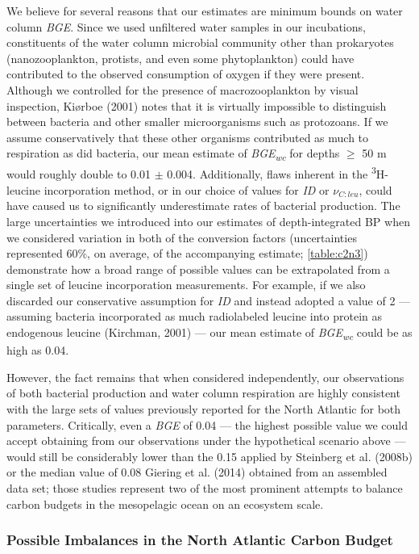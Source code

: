 We believe for several reasons that our estimates are minimum bounds on water column \emph{BGE}. Since we used unfiltered water samples in our incubations, constituents of the water column microbial community other than prokaryotes (nanozooplankton, protists, and even some phytoplankton) could have contributed to the observed consumption of oxygen if they were present. Although we controlled for the presence of macrozooplankton by visual inspection, Ki\o{}rboe (2001) notes that it is virtually impossible to distinguish between bacteria and other smaller microorganisms such as protozoans. If we assume conservatively that these other organisms contributed as much to respiration as did bacteria, our mean estimate of \emph{BGE\textsubscript{wc}} for depths $\geq$ 50 m would roughly double to 0.01 $\pm$ 0.004. Additionally, flaws inherent in the \textsuperscript{3}H-leucine incorporation method, or in our choice of values for \emph{ID} or $\nu _{C:leu}$, could have caused us to significantly underestimate rates of bacterial production. The large uncertainties we introduced into our estimates of depth-integrated BP when we considered variation in both of the conversion factors (uncertainties represented 60\%, on average, of the accompanying estimate; \autoref{table:c2n3}) demonstrate how a broad range of possible values can be extrapolated from a single set of leucine incorporation measurements. For example, if we also discarded our conservative assumption for \emph{ID} and instead adopted a value of 2 --- assuming bacteria incorporated as much radiolabeled leucine into protein as endogenous leucine (Kirchman, 2001) --- our mean estimate of \emph{BGE\textsubscript{wc}} could be as high as 0.04.

However, the fact remains that when considered independently, our observations of both bacterial production and water column respiration are highly consistent with the large sets of values previously reported for the North Atlantic for both parameters. Critically, even a \emph{BGE} of 0.04 --- the highest possible value we could accept obtaining from our observations under the hypothetical scenario above --- would still be considerably lower than the 0.15 applied by Steinberg et al. (2008b) or the median value of 0.08 Giering et al. (2014) obtained from an assembled data set; those studies represent two of the most prominent attempts to balance carbon budgets in the mesopelagic ocean on an ecosystem scale.

\subsubsection{Possible Imbalances in the North Atlantic Carbon Budget}


